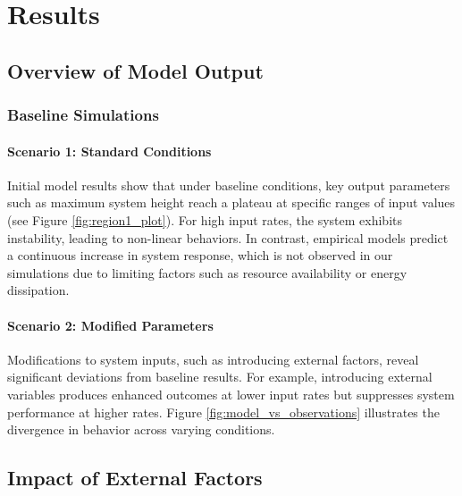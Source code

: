 \chapter{Results}

\fancyfoot[C]{\thepage}

\section{Overview of Model Output}
    \subsection{Baseline Simulations}
        \subsubsection*{Scenario 1: Standard Conditions}
        Initial model results show that under baseline conditions, key output parameters such as maximum system height reach a plateau at specific ranges of input values (see Figure \ref{fig:region1_plot}). For high input rates, the system exhibits instability, leading to non-linear behaviors. In contrast, empirical models predict a continuous increase in system response, which is not observed in our simulations due to limiting factors such as resource availability or energy dissipation.

        \subsubsection*{Scenario 2: Modified Parameters}
        Modifications to system inputs, such as introducing external factors, reveal significant deviations from baseline results. For example, introducing external variables produces enhanced outcomes at lower input rates but suppresses system performance at higher rates. Figure \ref{fig:model_vs_observations} illustrates the divergence in behavior across varying conditions.
    

\section{Impact of External Factors}
